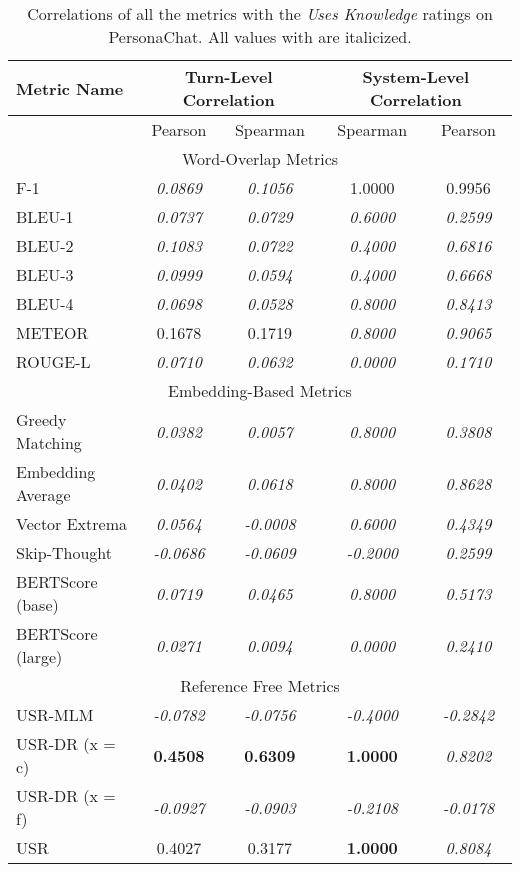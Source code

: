\documentclass[11pt,a4paper]{article}
\begin{document}
\begin{table*}
    \centering
    \renewcommand*{\arraystretch}{1.2}
    \begin{tabular}{|l|c|c|c|c|}
    \hline
        \textbf{Metric Name} & \multicolumn{2}{|c|}{\textbf{Turn-Level Correlation}} & \multicolumn{2}{|c|}{\textbf{System-Level Correlation}}  \\ \hline
         & Pearson & Spearman & Spearman & Pearson \\ \hline
         \multicolumn{5}{|c|}{Word-Overlap Metrics} \\ \hline
F-1 & \textit{0.0869} & \textit{0.1056} & 1.0000 & 0.9956 \\
BLEU-1 & \textit{0.0737} & \textit{0.0729} & \textit{0.6000} & \textit{0.2599} \\
BLEU-2 & \textit{0.1083} & \textit{0.0722} & \textit{0.4000} & \textit{0.6816} \\
BLEU-3 & \textit{0.0999} & \textit{0.0594} & \textit{0.4000} & \textit{0.6668} \\
BLEU-4 & \textit{0.0698} & \textit{0.0528} & \textit{0.8000} & \textit{0.8413} \\
METEOR & 0.1678 & 0.1719 & \textit{0.8000} & \textit{0.9065} \\
ROUGE-L & \textit{0.0710} & \textit{0.0632} & \textit{0.0000} & \textit{0.1710} \\\hline 
 \multicolumn{5}{|c|}{Embedding-Based Metrics} \\ \hline
Greedy Matching & \textit{0.0382} & \textit{0.0057} & \textit{0.8000} & \textit{0.3808} \\
Embedding Average & \textit{0.0402} & \textit{0.0618} & \textit{0.8000} & \textit{0.8628} \\
Vector Extrema & \textit{0.0564} & \textit{-0.0008} & \textit{0.6000} & \textit{0.4349} \\
Skip-Thought & \textit{-0.0686} & \textit{-0.0609} & \textit{-0.2000} & \textit{0.2599} \\
BERTScore (base) & \textit{0.0719} & \textit{0.0465} & \textit{0.8000} & \textit{0.5173} \\
BERTScore (large) & \textit{0.0271} & \textit{0.0094} & \textit{0.0000} & \textit{0.2410} \\\hline 
 \multicolumn{5}{|c|}{Reference Free Metrics} \\ \hline
USR-MLM & \textit{-0.0782} & \textit{-0.0756} & \textit{-0.4000} & \textit{-0.2842} \\
USR-DR (x = c) & \textbf{0.4508} & \textbf{0.6309} & \textbf{1.0000} & \textit{0.8202} \\
USR-DR (x = f) & \textit{-0.0927} & \textit{-0.0903} & \textit{-0.2108} & \textit{-0.0178} \\
USR & 0.4027 & 0.3177 & \textbf{1.0000} & \textit{0.8084} \\ \hline
    \end{tabular}
    \caption{Correlations of all the metrics with the \textit{Uses Knowledge} ratings on PersonaChat. All values with  are italicized.}
    
\end{table*}
\end{document}
